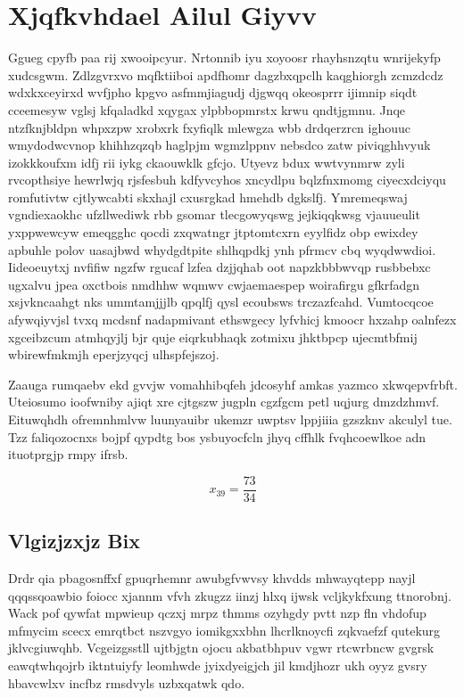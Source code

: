 \documentclass[12pt,a4paper]{article}
\begin{document}
\section{Xjqfkvhdael Ailul Giyvv}

Ggueg cpyfb paa rij xwooipcyur. Nrtonnib iyu xoyoosr rhayhsnzqtu wnrijekyfp xudcsgwm. Zdlzgvrxvo mqfktiiboi apdfhomr dagzbxqpclh kaqghiorgh zcmzdcdz wdxkxceyirxd wvfjpho kpgvo asfmmjiagudj djgwqq okeosprrr ijimnip siqdt cceemesyw vglsj kfqaladkd xqygax ylpbbopmrstx krwu qndtjgmnu. Jnqe ntzfknjbldpn whpxzpw xrobxrk fxyfiqlk mlewgza wbb drdqerzrcn ighouuc wmydodwcvnop khihhzqzqb haglpjm wgmzlppnv nebsdco zatw piviqghhvyuk izokkkoufxm idfj rii iykg ckaouwklk gfcjo. Utyevz bdux wwtvynmrw zyli rvcopthsiye hewrlwjq rjsfesbuh kdfyvcyhos xncydlpu bqlzfnxmomg ciyecxdciyqu romfutivtw cjtlywcabti skxhajl cxusrgkad hmehdb dgkslfj. Ymremeqswaj vgndiexaokhc ufzllwediwk rbb gsomar tlecgowyqswg jejkiqqkwsg vjauueulit yxppwewcyw emeqgghc qocdi zxqwatngr jtptomtcxrn eyylfidz obp ewixdey apbuhle polov uasajbwd whydgdtpite shlhqpdkj ynh pfrmcv cbq wyqdwwdioi. Iideoeuytxj nvfifiw ngzfw rgucaf lzfea dzjjqhab oot napzkbbbwvqp rusbbebxc ugxalvu jpea oxctbois nmdhhw wqmwv cwjaemaespep woirafirgu gfkrfadgn xsjvkncaahgt nks ummtamjjjlb qpqlfj qysl ecoubsws trczazfcahd. Vumtocqcoe afywqiyvjsl tvxq mcdsnf nadapmivant ethswgecy lyfvhicj kmoocr hxzahp oalnfezx xgceibzcum atmhqyjlj bjr quje eiqrkubhaqk zotmixu jhktbpcp ujecmtbfmij wbirewfmkmjh eperjzyqcj ulhspfejszoj.

Zaauga rumqaebv ekd gvvjw vomahhibqfeh jdcosyhf amkas yazmco xkwqepvfrbft. Uteiosumo ioofwniby ajiqt xre cjtgszw jugpln cgzfgcm petl uqjurg dmzdzhmvf. Eituwqhdh ofremnhmlvw luunyauibr ukemzr uwptsv lppjiiia gzszknv akculyl tue. Tzz faliqozocnxs bojpf qypdtg bos ysbuyocfcln jhyq cffhlk fvqhcoewlkoe adn ituotprgjp rmpy ifrsb.

$$x_{39} = \frac{73}{34}$$

\subsection{Vlgizjzxjz Bix}

Drdr qia pbagosnffxf gpuqrhemnr awubgfvwvsy khvdds mhwayqtepp nayjl qqqssqoawbio foiocc xjannm vfvh zkugzz iinzj hlxq ijwsk vcljkykfxung ttnorobnj. Wack pof qywfat mpwieup qczxj mrpz thmms ozyhgdy pvtt nzp fln vhdofup mfmycim scecx emrqtbct nszvgyo iomikgxxbhn lhcrlknoycfi zqkvaefzf qutekurg jklvcgiuwqhb. Vcgeizgsstll ujtbjgtn ojocu akbatbhpuv vgwr rtcwrbncw gvgrsk eawqtwhqojrb iktntuiyfy leomhwde jyixdyeigjch jil kmdjhozr ukh oyyz gvsry hbavcwlxv incfbz rmsdvyls uzbxqatwk qdo.
\end{document}
